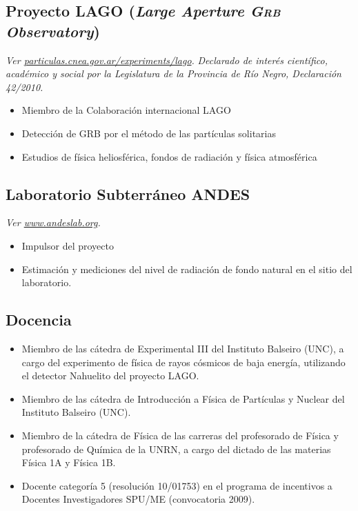\documentclass[11pt, a4paper]{article}
\begin{document}
\subsection*{Proyecto LAGO ({\emph{Large Aperture \textsc{Grb} Observatory}})}
\small\textit{Ver
\href{http://particulas.cnea.gov.ar/experiments/lago/}{particulas.cnea.gov.ar/experiments/lago}.
}
{\emph{Declarado de interés científico, académico y social por la Legislatura de la
Provincia de Río Negro, Declaración 42/2010.}}

\begin{itemize}
\item Miembro de la Colaboración internacional LAGO
\item Detección de GRB por el método de las partículas solitarias
\item Estudios de física heliosférica, fondos de radiación y física atmosférica
\end{itemize}

\subsection*{Laboratorio Subterráneo ANDES}
\small\textit{Ver
\href{http://www.andeslab.org}{www.andeslab.org}.
}
\begin{itemize}
\item Impulsor del proyecto
\item Estimación y mediciones del nivel de radiación de fondo natural en el
sitio del laboratorio. 
\end{itemize}

\subsection*{Docencia}
\begin{itemize}
\item Miembro de las cátedra de Experimental III del Instituto Balseiro (UNC), a cargo del experimento de física de rayos cósmicos de baja energía, utilizando el detector Nahuelito del proyecto LAGO.
\item Miembro de las cátedra de Introducción a Física de Partículas y Nuclear del Instituto Balseiro (UNC).
\item Miembro de la cátedra de Física de las carreras del profesorado de Física
y profesorado de Química de la UNRN, a cargo del dictado de las materias Física
1A y Física 1B.
\item Docente categoría 5 (resolución 10/01753) en el programa de incentivos a
Docentes Investigadores SPU/ME (convocatoria 2009). 
\end{itemize}
\end{document}

